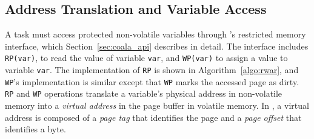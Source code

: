 \subsection{Address Translation and Variable Access}

A \sys task must access protected non-volatile variables through \sys's
restricted memory interface, which Section~\ref{sec:coala_api} describes in
detail.  The interface includes \texttt{RP(var)}, to read the value of variable
{\tt var}, and \texttt{WP(var)} to assign a value to variable {\tt var}. The
implementation of {\tt RP} is shown in Algorithm~\ref{algo:rwar}, and {\tt
WP}'s implementation is similar except that {\tt WP} marks the accessed page as
dirty.
%
{\tt RP} and {\tt WP} operations translate a variable's physical address in
non-volatile memory into a \emph{virtual address} in the page buffer in
volatile memory. In \sys, a virtual address is composed of a \emph{page tag}
that identifies the page and a \emph{page offset} that identifies a byte.


\begin{figure}
\end{figure}


